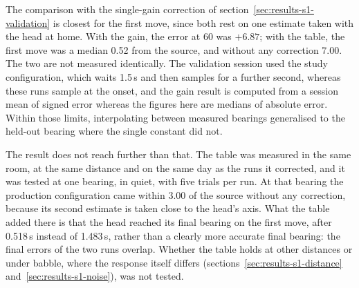 The comparison with the single-gain correction of
section~\ref{sec:results-s1-validation} is closest for the first move, since both
rest on one estimate taken with the head at home. With the gain, the error at
60\textdegree{} was $+6.87$\textdegree{}; with the table, the first move was a
median 0.52\textdegree{} from the source, and without any correction
7.00\textdegree{}. The two are not measured identically. The validation session
used the study configuration, which waits 1.5\,s and then samples for a further
second, whereas these runs sample at the onset, and the gain result is computed
from a session mean of signed error whereas the figures here are medians of
absolute error. Within those limits, interpolating between measured bearings
generalised to the held-out bearing where the single constant did not.

The result does not reach further than that. The table was measured in the same
room, at the same distance and on the same day as the runs it corrected, and it was
tested at one bearing, in quiet, with five trials per run. At that bearing the
production configuration came within 3.00\textdegree{} of the source without any
correction, because its second estimate is taken close to the head's axis. What
the table added there is that the head reached its final bearing on the first
move, after 0.518\,s instead of 1.483\,s, rather than a clearly more accurate final
bearing: the final errors of the two runs overlap. Whether the table holds at other
distances or under babble, where the response itself differs
(sections~\ref{sec:results-s1-distance} and~\ref{sec:results-s1-noise}), was not
tested.


